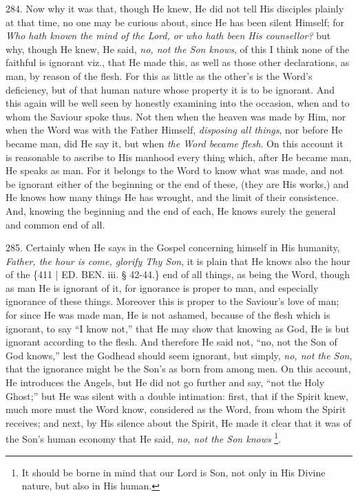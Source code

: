 284.
Now why it was that, though He knew, He did not tell His disciples
plainly at that time, no one may be curious about, since He has been
silent Himself; for \emph{Who hath known the mind of the Lord, or who
hath been His counsellor?} but why, though He knew, He said, \emph{no,
not the Son knows}, of this I think none of the faithful is
ignorant viz., that He made this, as well as those other declarations,
as man, by reason of the flesh. For this as little as the other's is
the Word's deficiency, but of that human nature whose property it is
to be ignorant. And this again will be well seen by honestly examining
into the occasion, when and to whom the Saviour spoke thus. Not then
when the heaven was made by Him, nor when the Word was with the Father
Himself, \emph{disposing all things}, nor before He became man, did He
say it, but when \emph{the Word became flesh}. On this account it is
reasonable to ascribe to His manhood every thing which, after He
became man, He speaks as man. For it belongs to the Word to know what
was made, and not be ignorant either of the beginning or the end of
these, (they are His works,) and He knows how many things He has
wrought, and the limit of their consistence. And, knowing the
beginning and the end of each, He knows surely the general and common
end of all.

285.
Certainly when He says in the Gospel concerning himself in His
humanity, \emph{Father, the hour is come, glorify Thy Son}, it is
plain that He knows also the hour of the \{411 | ED. BEN. iii. § 42-44.\}
end of all things, as being the Word, though as man He is ignorant of
it, for ignorance is proper to man, and especially ignorance of these
things. Moreover this is proper to the Saviour's love of man; for
since He was made man, He is not ashamed, because of the flesh which
is ignorant, to say ``I know not,'' that He may show that knowing as
God, He is but ignorant according to the flesh. And therefore He said
not, ``no, not the Son of God knows,'' lest the Godhead should seem
ignorant, but simply, \emph{no, not the Son}, that the ignorance might
be the Son's as born from among men. On this account, He introduces
the Angels, but He did not go further and say, ``not the Holy Ghost;''
but He was silent with a double intimation: first, that if the Spirit
knew, much more must the Word know, considered as the Word, from whom
the Spirit receives; and next, by His silence about the Spirit, He
made it clear that it was of the Son's human economy that He said, \emph{no,
not the Son knows} \footnote{It should be borne in mind that our Lord is Son, not only in His
Divine nature, but also in His human.}.

